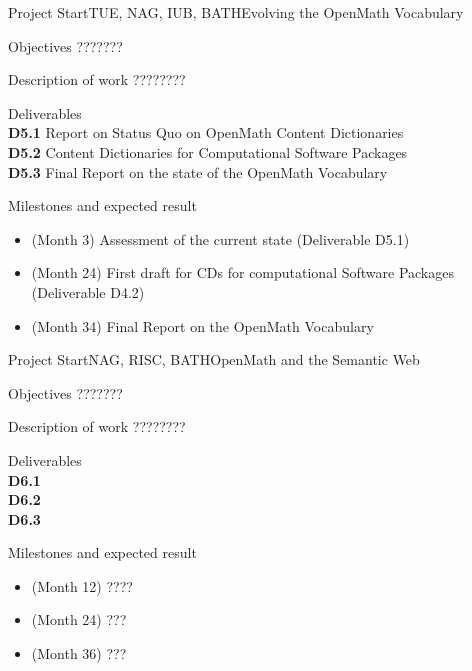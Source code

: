 \documentclass{euproposal}
\begin{document}
\begin{workpackage}{36}{5}{Project Start}{TUE, NAG, IUB, BATH}{Evolving the OpenMath Vocabulary} 
\begin{wpbox}{Objectives}
???????
\end{wpbox}
\begin{wpbox}{Description of work}
  ????????
\end{wpbox}
\begin{wpbox}{Deliverables\\}
{\bf D5.1} Report on Status Quo on OpenMath Content Dictionaries\\
{\bf D5.2} Content Dictionaries for Computational Software Packages\\
{\bf D5.3} Final Report on the state of the OpenMath Vocabulary\\
\end{wpbox}
\begin{wpbox}{Milestones and expected result}
\begin{itemize}
\item (Month 3) Assessment of the current state (Deliverable D5.1)
\item (Month 24) First draft for CDs for computational Software Packages
  (Deliverable D4.2)
\item (Month 34) Final Report on the OpenMath Vocabulary
\end{itemize}
\end{wpbox}
\end{workpackage}
\newpage
\begin{workpackage}{36}{6}{Project Start}{NAG, RISC, BATH}{OpenMath and the Semantic Web}
\begin{wpbox}{Objectives}
???????
\end{wpbox}
\begin{wpbox}{Description of work}
  ????????
\end{wpbox}
\begin{wpbox}{Deliverables\\}
{\bf D6.1} \\
{\bf D6.2} \\
{\bf D6.3} 
\end{wpbox}
\begin{wpbox}{Milestones and expected result}
\begin{itemize}
\item (Month 12) ????
\item (Month 24) ???
\item (Month 36) ???
\end{itemize}
\end{wpbox}
\end{workpackage}
\newpage
\end{document}
